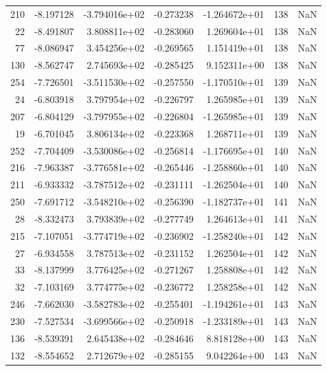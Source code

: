 \begin{tabular}{rrrrrrr}
 210 &  -8.197128 & -3.794016e+02 & -0.273238 & -1.264672e+01 &         138 & NaN \\
  22 &  -8.491807 &  3.808811e+02 & -0.283060 &  1.269604e+01 &         138 & NaN \\
  77 &  -8.086947 &  3.454256e+02 & -0.269565 &  1.151419e+01 &         138 & NaN \\
 130 &  -8.562747 &  2.745693e+02 & -0.285425 &  9.152311e+00 &         138 & NaN \\
 254 &  -7.726501 & -3.511530e+02 & -0.257550 & -1.170510e+01 &         139 & NaN \\
  24 &  -6.803918 &  3.797954e+02 & -0.226797 &  1.265985e+01 &         139 & NaN \\
 207 &  -6.804129 & -3.797955e+02 & -0.226804 & -1.265985e+01 &         139 & NaN \\
  19 &  -6.701045 &  3.806134e+02 & -0.223368 &  1.268711e+01 &         139 & NaN \\
 252 &  -7.704409 & -3.530086e+02 & -0.256814 & -1.176695e+01 &         140 & NaN \\
 216 &  -7.963387 & -3.776581e+02 & -0.265446 & -1.258860e+01 &         140 & NaN \\
 211 &  -6.933332 & -3.787512e+02 & -0.231111 & -1.262504e+01 &         140 & NaN \\
 250 &  -7.691712 & -3.548210e+02 & -0.256390 & -1.182737e+01 &         141 & NaN \\
  28 &  -8.332473 &  3.793839e+02 & -0.277749 &  1.264613e+01 &         141 & NaN \\
 215 &  -7.107051 & -3.774719e+02 & -0.236902 & -1.258240e+01 &         142 & NaN \\
  27 &  -6.934558 &  3.787513e+02 & -0.231152 &  1.262504e+01 &         142 & NaN \\
  33 &  -8.137999 &  3.776425e+02 & -0.271267 &  1.258808e+01 &         142 & NaN \\
  32 &  -7.103169 &  3.774775e+02 & -0.236772 &  1.258258e+01 &         142 & NaN \\
 246 &  -7.662030 & -3.582783e+02 & -0.255401 & -1.194261e+01 &         143 & NaN \\
 230 &  -7.527534 & -3.699566e+02 & -0.250918 & -1.233189e+01 &         143 & NaN \\
 136 &  -8.539391 &  2.645438e+02 & -0.284646 &  8.818128e+00 &         143 & NaN \\
 132 &  -8.554652 &  2.712679e+02 & -0.285155 &  9.042264e+00 &         143 & NaN \\

\end{tabular}
